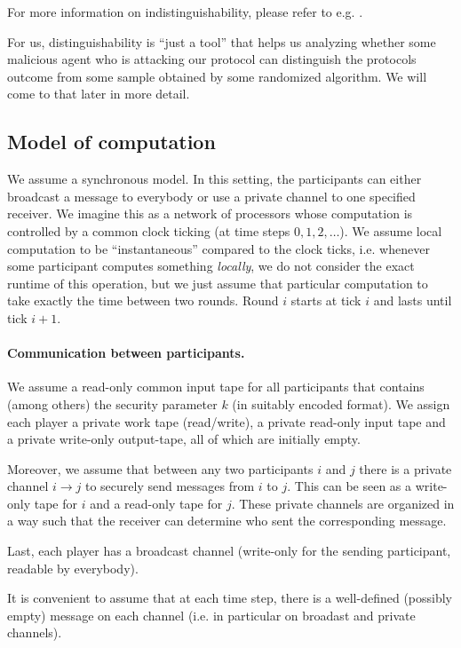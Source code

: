 \message{ !name(seminar.tex)}\documentclass{llncs}
\begin{document}
For more information on indistinguishability, please refer to e.g. \cite{goldreich_foundations_of_crypto_2}.

For us, distinguishability is ``just a tool'' that helps us analyzing whether some malicious agent who is attacking our protocol can distinguish the protocols outcome from some sample obtained by some randomized algorithm. We will come to that later in more detail.

\subsection{Model of computation}
\label{sec:model-of-computation}

We assume a synchronous model. In this setting, the participants can either broadcast a message to everybody or use a private channel to one specified receiver. We imagine this as a network of processors whose computation is controlled by a common clock ticking (at time steps $0,1,2,\dots$). We assume local computation to be ``instantaneous'' compared to the clock ticks, i.e. whenever some participant computes something \emph{locally}, we do not consider the exact runtime of this operation, but we just assume that particular computation to take exactly the time between two rounds. Round $i$ starts at tick $i$ and lasts until tick $i+1$.

\paragraph{Communication between participants.}

We assume a read-only common input tape for all participants that contains (among others) the security parameter $k$ (in suitably encoded format). We assign each player a private work tape (read/write), a private read-only input tape and a private write-only output-tape, all of which are initially empty. 

Moreover, we assume that between any two participants $i$ and $j$ there is a private channel $i\rightarrow j$ to securely send messages from $i$ to $j$. This can be seen as a write-only tape for $i$ and a read-only tape for $j$. These private channels are organized in a way such that the receiver can determine who sent the corresponding message.

Last, each player has a broadcast channel (write-only for the sending participant, readable by everybody).

It is convenient to assume that at each time step, there is a well-defined (possibly empty) message on each channel (i.e. in particular on broadast and private channels).
\end{document}
